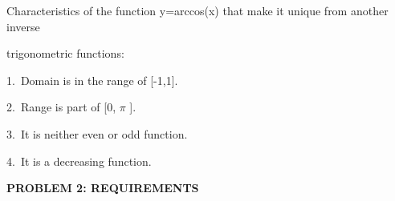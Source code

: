 \documentclass[12pt]{article}
\begin{document}
\vspace{\baselineskip}
Characteristics of the function y=arccos(x) that make it unique from another inverse\par

trigonometric functions:\par

1.\  Domain is in the range of [-1,1].\par

2.\  Range is part of [0, $ \pi $ ].\par

3.\  It is neither even or odd function.\par

4.\  It is a decreasing function.\par


\vspace{\baselineskip}
\textbf{PROBLEM 2: REQUIREMENTS}\par
\end{document}
